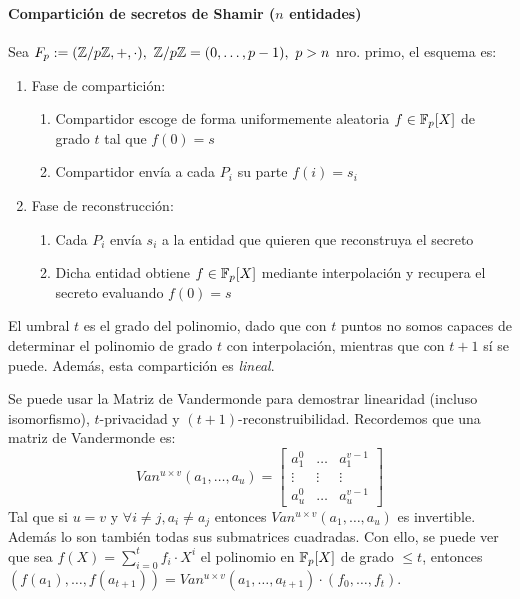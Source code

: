   \paragraph{Compartición de secretos de Shamir ($n$ entidades)}
  Sea $F_p := (\mathbb{Z}/p\mathbb{Z}, +, \cdot),\ \mathbb{Z}/p\mathbb{Z} = (0,\dots,p-1),\ p > n$ nro. primo, el esquema es:
  \begin{enumerate}
    \item Fase de compartición:
      \begin{enumerate}
        \item Compartidor escoge de forma uniformemente aleatoria $f \in \mathbb{F}_p[X]$ de grado $t$ tal que $f(0) = s$
        \item Compartidor envía a cada $P_i$ su parte $f(i) = s_i$
      \end{enumerate}
    \item Fase de reconstrucción:
      \begin{enumerate}
        \item Cada $P_i$ envía $s_i$ a la entidad que quieren que reconstruya el secreto 
        \item Dicha entidad obtiene $f \in \mathbb{F}_p[X]$ mediante interpolación y recupera el secreto 
          evaluando $f(0) = s$
      \end{enumerate}
  \end{enumerate}
  \begin{remark}
    El umbral $t$ es el grado del polinomio, dado que con $t$ puntos no somos capaces de determinar el 
    polinomio de grado $t$ con interpolación, mientras que con $t+1$ sí se puede.
    Además, esta compartición es \textit{lineal}.
  \end{remark}

  Se puede usar la Matriz de Vandermonde para demostrar linearidad (incluso isomorfismo),
  $t$-privacidad y $(t+1)$-reconstruibilidad.
  Recordemos que una matriz de Vandermonde es:
  \begin{equation*}
    Van^{u\times v}(a_1,\dots,a_u) = \begin{bmatrix}
      a_1^0 & \dots & a_1^{v-1} \\ 
      \vdots & \vdots & \vdots \\ 
      a_u^0 & \dots & a_u^{v-1}
    \end{bmatrix}
  \end{equation*}
  Tal que si $u = v$ y $\forall i\neq j, a_i \neq a_j$ entonces $Van^{u \times v}(a_1,\dots,a_u)$
  es invertible.
  Además lo son también todas sus submatrices cuadradas.
  Con ello, se puede ver que sea $f(X) = \sum_{i=0}^t f_i \cdot X^i$ el polinomio en $\mathbb{F}_p[X]$ de grado $\leq t$,
  entonces $(f(a_1),\dots,f(a_{t+1})) = Van^{u\times v}(a_1,\dots,a_{t+1})\cdot (f_0,\dots,f_t)$.


